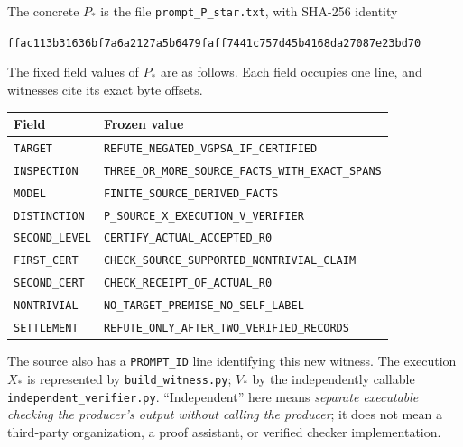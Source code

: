 \documentclass[11pt]{article}
\theoremstyle{remark}
\begin{document}
The concrete $P_*$ is the file \texttt{prompt\_P\_star.txt}, with SHA-256 identity
\begin{center}\small\texttt{ffac113b31636bf7a6a2127a5b6479faff7441c757d45b4168da27087e23bd70}\end{center}
The fixed field values of $P_*$ are as follows. Each field occupies one line, and witnesses cite its exact byte offsets.
\begin{center}
\begin{tabularx}{\linewidth}{@{}lX@{}}\toprule
Field & Frozen value \\ \midrule
\texttt{TARGET} & \texttt{REFUTE\_NEGATED\_VGPSA\_IF\_CERTIFIED} \\
\texttt{INSPECTION} & \texttt{THREE\_OR\_MORE\_SOURCE\_FACTS\_WITH\_EXACT\_SPANS} \\
\texttt{MODEL} & \texttt{FINITE\_SOURCE\_DERIVED\_FACTS} \\
\texttt{DISTINCTION} & \texttt{P\_SOURCE\_X\_EXECUTION\_V\_VERIFIER} \\
\texttt{SECOND\_LEVEL} & \texttt{CERTIFY\_ACTUAL\_ACCEPTED\_R0} \\
\texttt{FIRST\_CERT} & \texttt{CHECK\_SOURCE\_SUPPORTED\_NONTRIVIAL\_CLAIM} \\
\texttt{SECOND\_CERT} & \texttt{CHECK\_RECEIPT\_OF\_ACTUAL\_R0} \\
\texttt{NONTRIVIAL} & \texttt{NO\_TARGET\_PREMISE\_NO\_SELF\_LABEL} \\
\texttt{SETTLEMENT} & \texttt{REFUTE\_ONLY\_AFTER\_TWO\_VERIFIED\_RECORDS} \\
\bottomrule\end{tabularx}
\end{center}
The source also has a \texttt{PROMPT\_ID} line identifying this new witness. The execution $X_*$ is represented by \texttt{build\_witness.py}; $V_*$ by the independently callable \texttt{independent\_verifier.py}. ``Independent'' here means \emph{separate executable checking the producer's output without calling the producer}; it does not mean a third-party organization, a proof assistant, or verified checker implementation.
\end{document}
